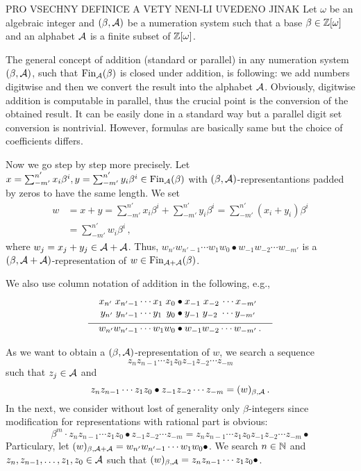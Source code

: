  PRO VSECHNY DEFINICE A VETY NENI-LI UVEDENO JINAK
     Let $\omega$ be an algebraic integer and $(\beta,\mathcal{A})$ be a numeration system such that a base $\beta \in \mathbb{Z}[\omega]$ and an alphabet $\mathcal{A}$ is a finite subset of $\mathbb{Z}[\omega]$. 

The general concept of addition (standard or parallel) in any numeration system $(\beta,\mathcal{A})$, such that $\text{Fin}_{\mathcal{A}}(\beta)$ is closed under addition, is following: we add numbers digitwise and then we convert the result into the alphabet $\mathcal{A}$. Obviously, digitwise addition is computable in parallel, thus the crucial point is the conversion of the obtained result. It can be easily done in a standard way but a parallel digit set conversion is nontrivial. However, formulas are basically same but the choice of coefficients differs.

Now we go step by step more precisely. Let $x=\sum_{-m'}^{n'} x_i\beta^i,y=\sum_{-m'}^{n'} y_i\beta^i \in \text{Fin}_{\mathcal{A}}(\beta)$ with $(\beta,\mathcal{A})$-representantions padded by zeros to have the same length. We set 
  \begin{align*}
    w&=x+y =\sum_{-m'}^{n'} x_i\beta^i + \sum_{-m'}^{n'} y_i\beta^i = \sum_{-m'}^{n'} (x_i+y_i)\beta^i \\
    &=\sum_{-m'}^{n'} w_i\beta^i \,,
  \end{align*}
  where $w_j=x_j+y_j \in \mathcal{A} +\mathcal{A}$. Thus, $w_{n'} w_{{n'}-1}\cdots w_1 w_0 \bullet w_{-1} w_{-2} \cdots w_{-m'}$ is a  $(\beta, \mathcal{A}+\mathcal{A})$-representation of $w\in \text{Fin}_{\mathcal{A}+\mathcal{A}}(\beta)$. 

We also use column notation of addition in the following, e.g.,     
  \begin{align*}
  x_{n'} \;x_{{n'}-1}\cdots x_1 \;x_0 &\bullet x_{-1} \;x_{-2}\, \cdots x_{-m'} \\[-3pt]
  y_{n'} \;y_{{n'}-1}\cdots y_1 \,\;y_0 &\bullet y_{-1} \;y_{-2} \;\cdots y_{-m'} \\[-7pt]
    \line(1,0){90} & \line(1,0){100} \\[-7pt]
  w_{n'} w_{{n'}-1}\cdots w_1 w_0 &\bullet w_{-1} w_{-2} \cdots w_{-m'}\,.
  \end{align*}
  
As we want to obtain a $(\beta,\mathcal{A})$-representation of $w$, we search a sequence 
  $$z_{n} z_{n-1}\cdots z_1 z_0 z_{-1} z_{-2} \cdots z_{-m}$$ such that $z_j \in \mathcal{A}$ and
  $$
    z_{n} z_{n-1}\cdots z_1 z_0 \bullet z_{-1} z_{-2} \cdots z_{-m}=(w)_{\beta,\mathcal{A}}\,.
  $$
  In the next, we consider without lost of generality only $\beta$-integers since modification for representations with rational part is obvious:
  $$
  \beta^m \cdot z_{n} z_{n-1}\cdots z_1 z_0 \bullet z_{-1} z_{-2} \cdots z_{-m} = z_{n} z_{n-1}\cdots z_1 z_0 z_{-1} z_{-2} \cdots z_{-m} \bullet
  $$  
  Particulary, let $(w)_{\beta, \mathcal{A}+\mathcal{A}}=w_{n'} w_{{n'}-1}\cdots w_1 w_0 \bullet$. We search $n \in \mathbb{N}$ and $z_{n}, z_{n-1},\dots, z_1, z_0 \in \mathcal{A}$ such that $(w)_{\beta, \mathcal{A}}=z_{n} z_{n-1}\cdots z_1 z_0 \bullet$.   
  
